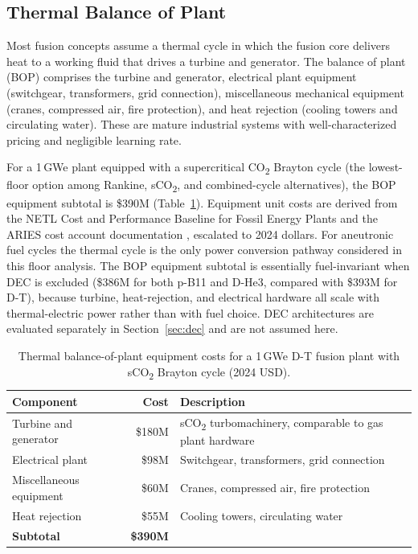 \documentclass{article}
\begin{document}
\subsection{Thermal Balance of Plant}
\label{sec:bop}

Most fusion concepts assume a thermal cycle in which the fusion core
delivers heat to a working fluid that drives a turbine and
generator. The balance of plant (BOP) comprises the turbine and
generator, electrical plant equipment (switchgear, transformers,
grid connection), miscellaneous mechanical equipment (cranes,
compressed air, fire protection), and heat rejection (cooling towers
and circulating water). These are mature industrial systems with
well-characterized pricing and negligible learning rate.

For a 1\,GWe plant equipped with a supercritical CO\textsubscript{2}
Brayton cycle (the lowest-floor option among Rankine,
sCO\textsubscript{2}, and combined-cycle alternatives), the BOP
equipment subtotal is \$390M
(Table~\ref{tab:bop}). Equipment unit costs are derived from the
NETL Cost and Performance Baseline for Fossil Energy Plants
\citep{NETL2022} and the ARIES cost account documentation
\citep{Waganer2013}, escalated to 2024 dollars. For aneutronic fuel
cycles the thermal cycle is the only power conversion pathway
considered in this floor analysis. The BOP equipment subtotal is
essentially fuel-invariant when DEC is excluded (\$386M for both
p-B11 and D-He3, compared with \$393M for D-T), because turbine,
heat-rejection, and electrical hardware all scale with
thermal-electric power rather than with fuel choice. DEC
architectures are evaluated separately in Section~\ref{sec:dec}
and are not assumed here.

\begin{table}[htbp]
\caption{Thermal balance-of-plant equipment costs for a 1\,GWe D-T
fusion plant with sCO\textsubscript{2} Brayton cycle (2024 USD).}
\label{tab:bop}
\centering
\begin{tabular}{lrl}
\toprule
Component & Cost & Description \\
\midrule
Turbine and generator & \$180M & sCO\textsubscript{2}
turbomachinery, comparable to gas plant hardware \\
Electrical plant & \$98M & Switchgear, transformers, grid
connection \\
Miscellaneous equipment & \$60M & Cranes, compressed air, fire
protection \\
Heat rejection & \$55M & Cooling towers, circulating water \\
\midrule
\textbf{Subtotal} & \textbf{\$390M} & \\
\bottomrule
\end{tabular}
\end{table}
\end{document}
